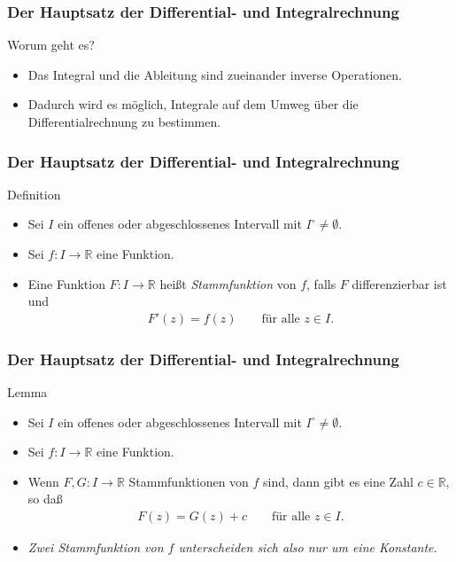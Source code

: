 \documentclass{beamer}
\title[Annuma]{\mytitle}
\author[Amin Coja-Oghlan]{Amin Coja-Oghlan}
\institute[Frankfurt]{JWGUFFM}
\date{}
\renewcommand{\emph}[1]{{\textcolor{solarizedRed}{\itshape #1}}}
\newcommand\RR{\mathbb R}
\renewcommand{\oe}{\"o}
\newcommand{\ue}{\"u}
\newcommand{\mytitle}{Der Hauptsatz der Differential- und Integralrechnung}
\begin{document}
\frame[plain]{\titlepage}

\begin{frame}\frametitle{\mytitle}
	\begin{block}{Worum geht es?}
		\begin{itemize}
			\item Das Integral und die Ableitung sind zueinander inverse Operationen.
			\item Dadurch wird es m\oe glich, Integrale auf dem Umweg \ue ber die Differentialrechnung zu bestimmen.
		\end{itemize}
	\end{block}
\end{frame}

\begin{frame}\frametitle{\mytitle}
	\begin{block}{Definition}
		\begin{itemize}
			\item Sei $I$ ein offenes oder abgeschlossenes Intervall mit $I^\circ\neq\emptyset$.
			\item Sei $f:I\to\RR$ eine Funktion.
			\item Eine Funktion $F:I\to\RR$ hei\ss t \emph{Stammfunktion} von $f$, falls $F$ differenzierbar ist und
				\begin{align*}
					F'(z)=f(z)\qquad\mbox{f\ue r alle }z\in I.
				\end{align*}
		\end{itemize}
	\end{block}
\end{frame}

\begin{frame}\frametitle{\mytitle}
	\begin{block}{Lemma}
		\begin{itemize}
			\item Sei $I$ ein offenes oder abgeschlossenes Intervall mit $I^\circ\neq\emptyset$.
			\item Sei $f:I\to\RR$ eine Funktion.
			\item Wenn $F,G:I\to\RR$ Stammfunktionen von $f$ sind, dann gibt es eine Zahl $c\in\RR$, so da\ss
				\begin{align*}
					F(z)=G(z)+c\qquad\mbox{f\ue r alle }z\in I.
				\end{align*}
			\item {\itshape Zwei Stammfunktion von $f$ unterscheiden sich also nur um eine Konstante.}
		\end{itemize}
	\end{block}
\end{frame}
\end{document}
